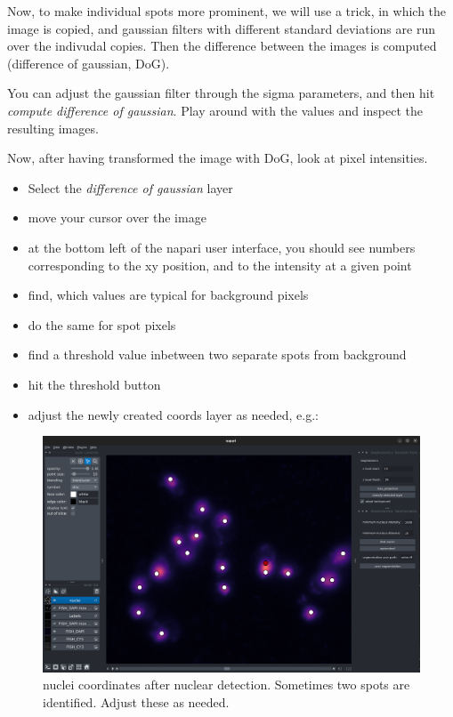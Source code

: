 \documentclass[11pt]{article} %
\begin{document}
Now, to make individual spots more prominent, we will use a trick, in which the image is copied, and gaussian filters with different standard deviations are run over the indivudal copies. 
Then the difference between the images is computed (difference of gaussian, DoG). 

You can adjust the gaussian filter through the sigma parameters, and then hit {\it compute difference of gaussian}. 
Play around with the values and inspect the resulting images. 

Now, after having transformed the image with DoG, look at pixel intensities. 

\begin{itemize}
\item Select the {\it difference of gaussian} layer 
\item move your cursor over the image
\item at the bottom left of the napari user interface, you should see numbers corresponding to the xy position, and to the intensity at a given point
\item find, which values are typical for background pixels
\item do the same for spot pixels
\item find a threshold value inbetween two separate spots from background
\item hit the threshold button
\item adjust the newly created coords layer as needed, e.g.:
\end{itemize}

\begin{figure}[H]
\includegraphics[width=14cm]{images/napari_viewer_7.png}
\caption{nuclei coordinates after nuclear detection. Sometimes two spots are identified. Adjust these as needed.}
\end{figure}
\end{document}
